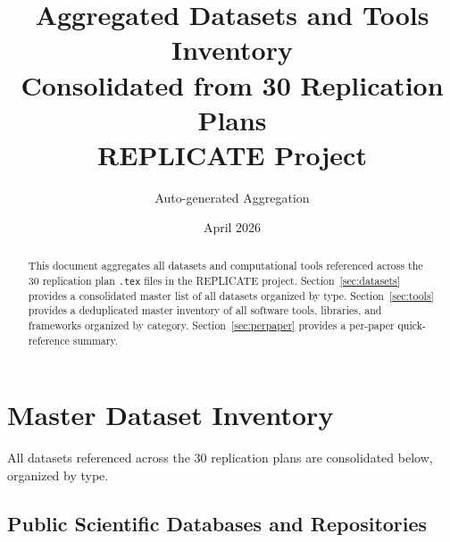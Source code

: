 \documentclass[11pt,a4paper]{article}
\title{\textbf{Aggregated Datasets and Tools Inventory}\\[0.5em]
\large Consolidated from 30 Replication Plans\\[0.3em]
\normalsize REPLICATE Project}
\author{Auto-generated Aggregation}
\date{April 2026}
\begin{document}
\maketitle

\begin{abstract}
This document aggregates all datasets and computational tools referenced across the 30 replication plan \texttt{.tex} files in the REPLICATE project. Section~\ref{sec:datasets} provides a consolidated master list of all datasets organized by type. Section~\ref{sec:tools} provides a deduplicated master inventory of all software tools, libraries, and frameworks organized by category. Section~\ref{sec:perpaper} provides a per-paper quick-reference summary.
\end{abstract}

\tableofcontents
\newpage

\section{Master Dataset Inventory}
\label{sec:datasets}

All datasets referenced across the 30 replication plans are consolidated below, organized by type.

\subsection{Public Scientific Databases and Repositories}
\end{document}
